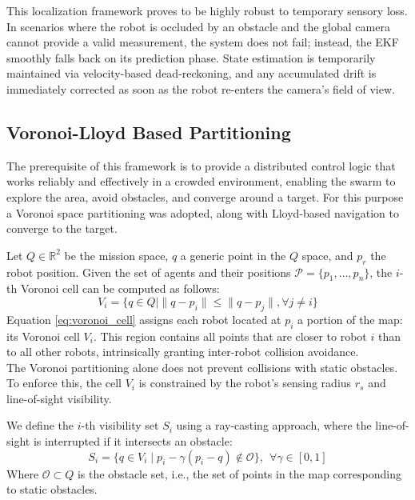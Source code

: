 \documentclass[times, twoside]{zHenriquesLab-StyleBioRxiv}
\begin{document}
This localization framework proves to be highly robust to temporary sensory loss. In scenarios where the robot is occluded by an obstacle and the global camera cannot provide a valid measurement, the system does not fail; instead, the EKF smoothly falls back on its prediction phase. State estimation is temporarily maintained via velocity-based dead-reckoning, and any accumulated drift is immediately corrected as soon as the robot re-enters the camera's field of view.



\subsection{Voronoi-Lloyd Based Partitioning}
The prerequisite of this framework is to provide a distributed control logic that works reliably and effectively in a crowded environment, enabling the swarm to explore the area, avoid obstacles, and converge around a target. For this purpose a Voronoi space partitioning was adopted, along with Lloyd-based navigation \cite{fontanelli} to converge to the target.

 Let $Q \in \mathbb{R}^2$ be the mission space, $q$ a generic point in the $Q$ space, and $p_r$ the robot position. Given the set of agents and their positions $\mathcal{P} = \{p_1, \dots, p_n\}$, the $i$-th Voronoi cell can be computed as follows:
\begin{equation}
    V_i = \{q \in Q \mid \|q - p_i\| \leq \|q - p_j\|, \forall j \neq i\}
    \label{eq:voronoi_cell}
\end{equation}
Equation \ref{eq:voronoi_cell} assigns each robot located at $p_i$ a portion of the map: its Voronoi cell $V_i$. This region contains all points that are closer to robot $i$ than to all other robots, intrinsically granting inter-robot collision avoidance.
\\

The Voronoi partitioning alone does not prevent collisions with static obstacles. To enforce this, the cell $V_i$ is constrained by the robot's sensing radius $r_s$ and line-of-sight visibility.


We define the $i$-th visibility set $S_i$ using a ray-casting approach, where the line-of-sight is interrupted if it intersects an obstacle:
\begin{equation}
    S_i = \{q \in V_i \mid p_i - \gamma(p_i - q) \notin \mathcal{O}\}, \ \  \forall \gamma \in [0,1]
\end{equation}
Where $\mathcal{O} \subset Q$ is the obstacle set, i.e., the set of points in the map corresponding to static obstacles.
\end{document}
